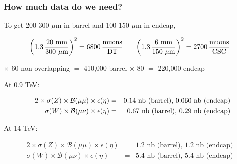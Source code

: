\documentclass[compress]{beamer}
\begin{document}
\begin{frame}
\frametitle{How much data do we need?}

To get 200-300 $\mu$m in barrel and 100-150 $\mu$m in endcap,

\vspace{-0.5 cm}
\[ \left(1.3 \, \frac{\mbox{20 mm}}{\mbox{300 $\mu$m}}\right)^2 = \mbox{6800}\,\frac{\mbox{muons}}{\mbox{DT}} \mbox{\hspace{0.6 cm}} \left(1.3 \, \frac{\mbox{6 mm}}{\mbox{150 $\mu$m}}\right)^2 = \mbox{2700}\,\frac{\mbox{muons}}{\mbox{CSC}} \]

$\times$ 60 {\small non-overlapping} $=$ 410,000 barrel \mbox{\hspace{0.5 cm}} $\times$ 80 $=$ 220,000 endcap

\vfill
At 0.9 TeV:

\vspace{-0.75 cm}
\begin{eqnarray*}
\mbox{\hspace{0.3 cm}} 2 \times \sigma(Z) \times {\mathcal B}(\mu\mu) \times \epsilon(\eta) &=& \mbox{0.14 nb (barrel), 0.060 nb (endcap)} \\
\sigma(W) \times {\mathcal B}(\mu\nu) \times \epsilon(\eta) &=& \mbox{0.67 nb (barrel), 0.29 nb (endcap)}
\end{eqnarray*}

\vfill
At 14 TeV:

\vspace{-0.75 cm}
\begin{eqnarray*}
2 \times \sigma(Z) \times {\mathcal B}(\mu\mu) \times \epsilon(\eta) &=& \mbox{1.2 nb (barrel), 1.2 nb (endcap)} \\
\sigma(W) \times {\mathcal B}(\mu\nu) \times \epsilon(\eta) &=& \mbox{5.4 nb (barrel), 5.4 nb (endcap)}
\end{eqnarray*}
\end{frame}
\end{document}
